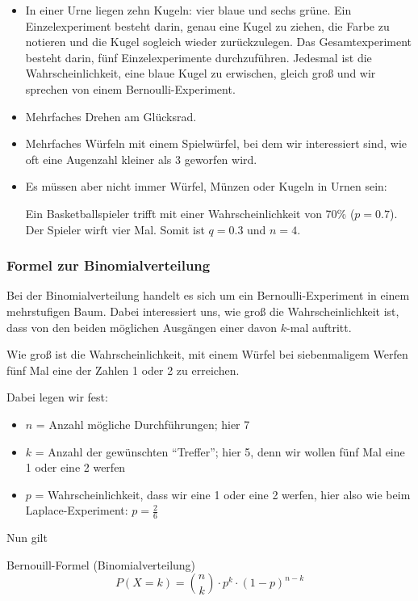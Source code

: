 \begin{itemize}
\item
In einer Urne liegen zehn Kugeln: vier blaue und sechs grüne. Ein
Einzelexperiment besteht darin, genau eine Kugel zu ziehen, die Farbe
zu notieren und die Kugel sogleich wieder zurückzulegen.
Das Gesamtexperiment besteht darin, fünf Einzelexperimente
durchzuführen. Jedesmal ist die Wahrscheinlichkeit, eine blaue Kugel
zu erwischen, gleich groß und wir sprechen von einem Bernoulli-Experiment.

\item Mehrfaches Drehen am Glücksrad.

\item Mehrfaches Würfeln mit einem Spielwürfel, bei dem wir
  interessiert sind, wie oft eine Augenzahl kleiner als 3 geworfen wird.
  
\item
Es müssen aber nicht immer Würfel, Münzen oder Kugeln in Urnen sein:

Ein Basketballspieler trifft mit einer Wahrscheinlichkeit von 70\%
($p=0.7$). Der Spieler wirft vier Mal. Somit ist $q=0.3$ und $n=4$.


\end{itemize}
\newpage


\subsubsection{Formel zur Binomialverteilung}
Bei der Binomialverteilung handelt es sich um ein
Bernoulli-Experiment
in einem mehrstufigen Baum. Dabei interessiert
uns, wie groß die Wahrscheinlichkeit ist, dass von den beiden
möglichen Ausgängen einer davon $k$-mal auftritt.

Wie groß ist die Wahrscheinlichkeit, mit einem Würfel bei siebenmaligem
Werfen fünf Mal eine der Zahlen 1 oder 2 zu erreichen.

Dabei legen wir fest:
\begin{itemize}
\item
  $n$ = Anzahl mögliche Durchführungen; hier 7
\item
  $k$ = Anzahl der gewünschten ``Treffer''; hier 5, denn wir wollen fünf
Mal eine 1 oder eine 2 werfen
\item
  $p$ = Wahrscheinlichkeit, dass wir eine 1 oder eine 2 werfen, hier
  also wie beim Laplace-Experiment: $p=\frac26$
\end{itemize}

Nun gilt

\begin{gesetz}{Bernouill-Formel (Binomialverteilung)}{}
  $$P(X=k) = {{n}\choose {k}}\cdot{}p^k\cdot{}(1-p)^{n-k}$$
\end{gesetz}

